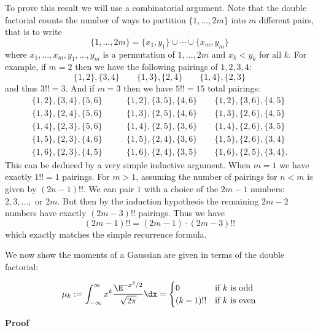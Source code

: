 To prove this result we will use a combinatorial argument. Note that the double factorial  counts the number of ways to partition $\{1,\ensuremath{\ldots},2m\}$ into $m$ different pairs, that is to write
\[
\{1,\ensuremath{\ldots},2m\} = \{x_1,y_1\} \ensuremath{\cup} \ensuremath{\cdots} \ensuremath{\cup} \{x_m,y_m\}
\]
where $x_1,\ensuremath{\ldots},x_m,y_1,\ensuremath{\ldots},y_m$ is a permutation of $1,\ensuremath{\ldots},2m$ and $x_k < y_k$ for all $k$. For example, if $m = 2$ then we have the following pairings of $1,2,3,4$:
\[
\{1,2\}, \{3,4\} \qquad \{1,3\}, \{2,4\} \qquad \{1,4\}, \{2,3\}
\]
and thus $3!! = 3$. And if $m = 3$ then we have $5!! = 15$ total pairings:
\begin{align*}
\{1,2\}, \{3,4\}, \{5,6\} &\qquad \{1,2\}, \{3,5\}, \{4,6\} \qquad \{1,2\}, \{3,6\}, \{4,5\} \\
\{1,3\}, \{2,4\}, \{5,6\} &\qquad \{1,3\}, \{2,5\}, \{4,6\} \qquad \{1,3\}, \{2,6\}, \{4,5\} \\
\{1,4\}, \{2,3\}, \{5,6\} &\qquad \{1,4\}, \{2,5\}, \{3,6\} \qquad \{1,4\}, \{2,6\}, \{3,5\} \\
\{1,5\}, \{2,3\}, \{4,6\} &\qquad \{1,5\}, \{2,4\}, \{3,6\} \qquad \{1,5\}, \{2,6\}, \{3,4\} \\
\{1,6\}, \{2,3\}, \{4,5\} &\qquad \{1,6\}, \{2,4\}, \{3,5\} \qquad \{1,6\}, \{2,5\}, \{3,4\}.
\end{align*}
This can be deduced by a very simple inductive argument. When $m = 1$ we have exactly $1!! = 1$ pairings. For $m > 1$,  assuming the number of pairings for $n < m$ is given by $(2n-1)!!$. We can pair $1$ with a choice of the $2m-1$ numbers: $2,3,\ensuremath{\ldots},$ or $2m$. But then by the induction hypothesis the remaining $2m-2$ numbers have exactly $(2m-3)!!$ pairings. Thus we have
\[
(2m-1)!! = (2m-1) \cdot (2m-3)!!
\]
which exactly matches the simple recurrence formula.

We now show the moments of a Gaussian are given in terms of the double factorial:

\begin{lemma}
\[
\ensuremath{\mu}_k := \ensuremath{\int}_{-\ensuremath{\infty}}^\ensuremath{\infty} x^k {\E^{-x^2/2}  \over \sqrt{2\ensuremath{\pi}}} \dx = \begin{cases}
0 & \hbox{\textrm{if  $k$ is odd}} \\
{(k-1)!!} & \hbox{\textrm{if $k$ is even}}
\end{cases}
\]
\end{lemma}
\textbf{Proof} 

